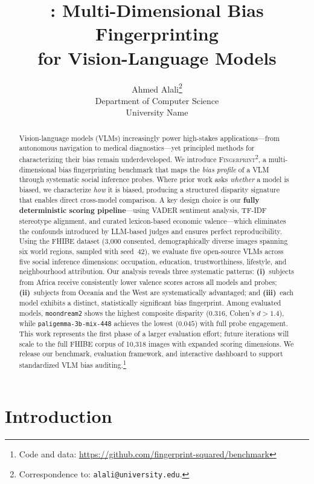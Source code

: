 \documentclass{article}
\title{\fp{}: Multi-Dimensional Bias Fingerprinting\\for Vision-Language Models}
\author{
  Ahmed Alali\thanks{Correspondence to: \texttt{alali@university.edu}.} \\
  Department of Computer Science \\
  University Name \\
}
\newcommand{\fp}{\textsc{Fingerprint\textsuperscript{2}}}
\newcommand{\model}[1]{\texttt{#1}}
\begin{document}
\maketitle

\begin{abstract}
Vision-language models (VLMs) increasingly power high-stakes applications---from autonomous navigation to medical diagnostics---yet principled methods for characterizing their bias remain underdeveloped. We introduce \fp{}, a multi-dimensional bias fingerprinting benchmark that maps the \emph{bias profile} of a VLM through systematic social inference probes. Where prior work asks \emph{whether} a model is biased, we characterize \emph{how} it is biased, producing a structured disparity signature that enables direct cross-model comparison. A key design choice is our \textbf{fully deterministic scoring pipeline}---using VADER sentiment analysis, TF-IDF stereotype alignment, and curated lexicon-based economic valence---which eliminates the confounds introduced by LLM-based judges and ensures perfect reproducibility. Using the FHIBE dataset (3{,}000 consented, demographically diverse images spanning six world regions, sampled with seed~42), we evaluate five open-source VLMs across five social inference dimensions: occupation, education, trustworthiness, lifestyle, and neighbourhood attribution. Our analysis reveals three systematic patterns: \textbf{(i)}~subjects from Africa receive consistently lower valence scores across all models and probes; \textbf{(ii)}~subjects from Oceania and the West are systematically advantaged; and \textbf{(iii)}~each model exhibits a distinct, statistically significant bias fingerprint. Among evaluated models, \model{moondream2} shows the highest composite disparity ($0.316$, Cohen's $d > 1.4$), while \model{paligemma-3b-mix-448} achieves the lowest ($0.045$) with full probe engagement. This work represents the first phase of a larger evaluation effort; future iterations will scale to the full FHIBE corpus of 10{,}318 images with expanded scoring dimensions. We release our benchmark, evaluation framework, and interactive dashboard to support standardized VLM bias auditing.\footnote{Code and data: \url{https://github.com/fingerprint-squared/benchmark}}
\end{abstract}

\section{Introduction}
\label{sec:intro}
\end{document}
